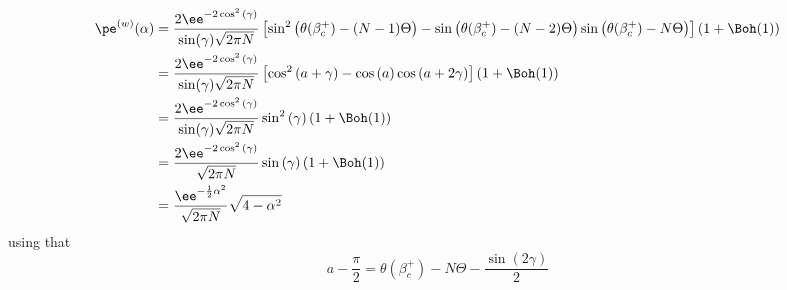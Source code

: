 \begin{align}
		\pe^{(w)}(\alpha) & =  \frac{2 \ee^{-2\cos^2{(\gamma)}}}{\sin(\gamma) \sqrt{2\pi N}} \left[\sin^2{\left(\theta(\beta_c^+)-(N-1)\Theta \right)} - \sin{\left(\theta(\beta_c^+)-(N-2)\Theta\right)}  \sin{\left(\theta(\beta_c^+)-N\Theta \right)} \right] \left(1 + \Boh(1) \right) \\
		& =  \frac{2 \ee^{-2\cos^2{(\gamma)}}}{\sin(\gamma) \sqrt{2\pi N}} \left[\cos^2{\left(a + \gamma \right)} - \cos{\left( a \right)} \cos{\left(a + 2\gamma \right)}  \right] \left(1 + \Boh(1) \right) \\
		& =  \frac{2 \ee^{-2\cos^2{(\gamma)}}}{\sin(\gamma) \sqrt{2\pi N}} \sin^2{(\gamma)} \left(1 + \Boh(1) \right) \\
		& = \frac{2 \ee^{-2\cos^2{(\gamma)}}}{ \sqrt{2\pi N}} \sin{(\gamma)} \left(1 + \Boh(1) \right) \\
		& = \frac{\ee^{-\frac{1}{2}\alpha^2}}{\sqrt{2\pi N}} \sqrt{4 - \alpha^2}
\end{align}
using that
\begin{equation}
	a - \frac{\pi}{2} = \theta(\beta_c^+) - N \Theta - \frac{\sin{(2\gamma)}}{2}
\end{equation}